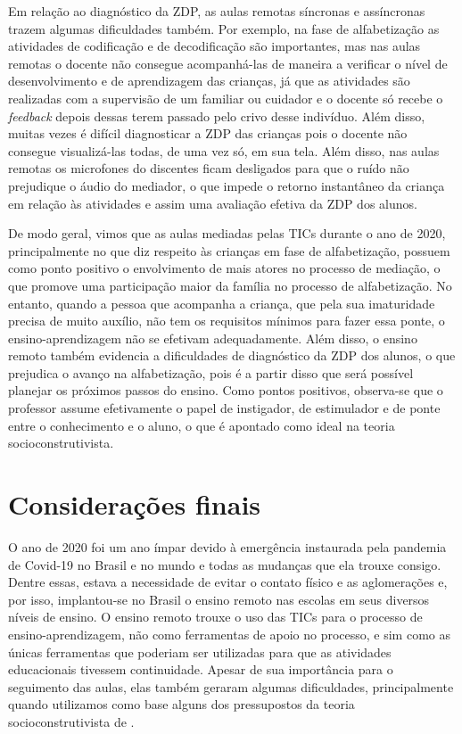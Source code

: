 \documentclass{textolivre}
\begin{document}
Em relação ao diagnóstico da ZDP, as aulas remotas síncronas e assíncronas trazem algumas dificuldades também. Por exemplo, na fase de alfabetização as atividades de codificação e de decodificação são importantes, mas nas aulas remotas o docente não consegue acompanhá-las de maneira a verificar o nível de desenvolvimento e de aprendizagem das crianças, já que as atividades são realizadas com a supervisão de um familiar ou cuidador e o docente só recebe o \emph{feedback} depois dessas terem passado pelo crivo desse indivíduo. Além disso, muitas vezes é difícil diagnosticar a ZDP das crianças pois o docente não consegue visualizá-las todas, de uma vez só, em sua tela. Além disso, nas aulas remotas os microfones do discentes ficam desligados para que o ruído não prejudique o áudio do mediador, o que impede o retorno instantâneo da criança em relação às atividades e assim uma avaliação efetiva da ZDP dos alunos.

De modo geral, vimos que as aulas mediadas pelas TICs durante o ano de 2020, principalmente no que diz respeito às crianças em fase de alfabetização, possuem como ponto positivo o envolvimento de mais atores no processo de mediação, o que promove uma participação maior da família no processo de alfabetização. No entanto, quando a pessoa que acompanha a criança, que pela sua imaturidade precisa de muito auxílio, não tem os requisitos mínimos para fazer essa ponte, o ensino-aprendizagem não se efetivam adequadamente. Além disso, o ensino remoto também evidencia a dificuldades de diagnóstico da ZDP dos alunos, o que prejudica o avanço na alfabetização, pois é a partir disso que será possível planejar os próximos passos do ensino. Como pontos positivos, observa-se que o professor assume efetivamente o papel de instigador, de estimulador e de ponte entre o conhecimento e o aluno, o que é apontado como ideal na teoria socioconstrutivista.
	
\section{Considerações finais}
O ano de 2020 foi um ano ímpar devido à emergência instaurada pela pandemia de Covid-19 no Brasil e no mundo e todas as mudanças que ela trouxe consigo. Dentre essas, estava a necessidade de evitar o contato físico e as aglomerações e, por isso, implantou-se no Brasil o ensino remoto nas escolas em seus diversos níveis de ensino. O ensino remoto trouxe o uso das TICs para o processo de ensino-aprendizagem, não como ferramentas de apoio no processo, e sim como as únicas ferramentas que poderiam ser utilizadas para que as atividades educacionais tivessem continuidade. Apesar de sua importância para o seguimento das aulas, elas também geraram algumas dificuldades, principalmente quando utilizamos como base alguns dos pressupostos da teoria socioconstrutivista de \textcite{vygotski1991}.
\end{document}

